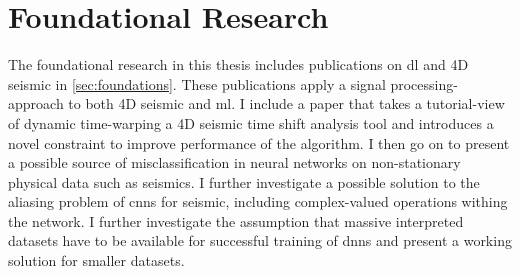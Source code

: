 \section{Foundational Research}

The foundational research in this thesis includes publications on \acl{dl} and 4D seismic in \cref{sec:foundations}. These publications apply a signal processing-approach to both 4D seismic and \acl{ml}. I include a paper that takes a tutorial-view of dynamic time-warping a 4D seismic time shift analysis tool and introduces a novel constraint to improve performance of the algorithm. I then go on to present a possible source of misclassification in neural networks on non-stationary physical data such as seismics. I further investigate a possible solution to the aliasing problem of \aclp{cnn} for seismic, including complex-valued operations withing the network. I further investigate the assumption that massive interpreted datasets have to be available for successful training of \aclp{dnn} and present a working solution for smaller datasets.

